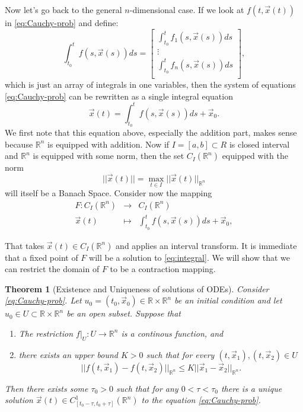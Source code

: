 \documentclass[10pt]{article}
\newtheorem{thm}{Theorem}[section]
\theoremstyle{definition}
\theoremstyle{remark}
\newcommand{\bbR}{\mathbb{R}}
\begin{document}
  Now let's go back to the general $n$-dimensional case. If we look at $f(t,\vec x(t))$ in \eqref{eq:Cauchy-prob} and define:
  \begin{equation}\label{eq:integral-def}
    \int_{t_0}^tf(s,\vec x(s))ds =
    \begin{bmatrix}
      \int_{t_0}^tf_1(s,\vec x(s))ds\\
      \vdots\\
      \int_{t_0}^tf_n(s,\vec x(s))ds\\
    \end{bmatrix},
  \end{equation} which is just an array of integrals in one variables, then the system of equations \eqref{eq:Cauchy-prob} can be rewritten as a single integral equation
  \begin{equation}
    \label{eq:integral}
    \vec x(t) = \int_{t_0}^tf(s,\vec x(s))ds + \vec x_0.
\end{equation}
We first note that this equation above, especially the addition part, makes sense because $\bbR^n$ is equipped with addition. Now if $I=[a,b] \subset R$ is closed interval and $\mathbb R^n$ is equipped with some norm, then the set $C_I(\mathbb R^n)$ equipped with the norm\[
  ||\vec x(t)|| = \max_{t \in I} ||\vec x(t)||_{\mathbb R^n}
\] will itself be a Banach Space. Consider now the mapping
\begin{equation}\label{eqn:ODE-contraction}
  \left.
    \begin{array}{rcl}
      F: C_I(\mathbb R^n) &\to& C_I(\mathbb R^n)\\
      \vec x(t) &\mapsto &\int_{t_0}^tf(s,\vec x(s))ds + \vec x_0,
    \end{array}
  \right.
\end{equation}

That takes $\vec x(t) \in C_I(\mathbb R^n)$ and applies an interval transform. It is immediate that a fixed point of $F$ will be a solution to \eqref{eq:integral}. We will show that we can restrict the domain of $F$ to be a contraction mapping.

\begin{thm}[Existence and Uniqueness of solutions of ODEs]\label{thm:ODE}
  Consider \eqref{eq:Cauchy-prob}. Let $u_0 = (t_0,\vec x_0) \in \bbR \times \bbR^n$ be an initial condition and let $u_0 \in U\subset \bbR \times\bbR^n$ be an open subset. Suppose that
  \begin{enumerate}
  \item The restriction $f|_U: U \to \bbR^n$ is a continous function, and
  \item\label{it:ODE-Lipshitz} there exists an upper bound $K>0$ such that for every $(t,\vec x_1),(t,\vec x_2) \in U$\[
      ||f(t,\vec x_1) - f(t,\vec x_2)||_{\mathbb R^n} \leq K ||\vec x_1 - \vec x_2||_{\mathbb R^n}. 
    \]
  \end{enumerate}
  Then there exists some $\tau_0>0$ such that for any $0 < \tau < \tau_0$ there is a unique solution $\vec x(t) \in C^1_{[t_0-\tau,t_0+\tau]}(\bbR^n)$ to the equation \eqref{eq:Cauchy-prob}.
\end{thm}
      
\end{document}
